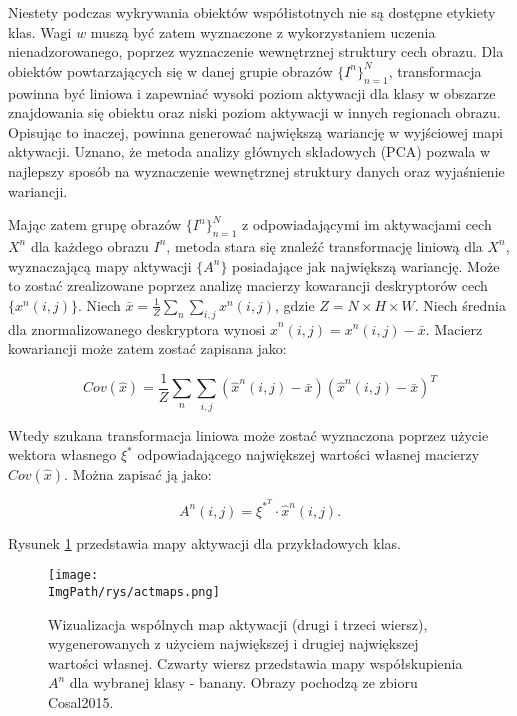 \documentclass[a4paper,12pt,twoside,openany]{report}
\newcommand{\ImgPath}{.}
\begin{document}
Niestety podczas wykrywania obiektów współistotnych nie są dostępne etykiety klas. Wagi $w$ muszą być zatem wyznaczone z wykorzystaniem uczenia nienadzorowanego, poprzez wyznaczenie wewnętrznej struktury cech obrazu. Dla obiektów powtarzających się w danej grupie obrazów $\{I^n\}^N_{n=1}$, transformacja powinna być liniowa i zapewniać wysoki poziom aktywacji dla klasy w obszarze znajdowania się obiektu oraz niski poziom aktywacji w innych regionach obrazu. Opisując to inaczej, powinna generować największą wariancję w wyjściowej mapi aktywacji. Uznano, że metoda analizy głównych składowych (PCA) pozwala w najlepszy sposób na wyznaczenie wewnętrznej struktury danych oraz wyjaśnienie wariancji.

Mając zatem grupę obrazów $\{I^n\}^N_{n=1}$ z odpowiadającymi im aktywacjami cech $X^n$ dla każdego obrazu $I^n$, metoda stara się znaleźć transformację liniową dla $X^n$, wyznaczającą mapy aktywacji $\{A^n\}$ posiadające jak największą wariancję. Może to zostać zrealizowane poprzez analizę macierzy kowarancji deskryptorów cech $\{x^n(i,j)\}$. Niech $\bar{x} = \frac{1}{Z}\sum_n\sum_{i,j}x^n(i,j)$, gdzie $Z=N\times H\times W$. Niech średnia dla znormalizowanego deskryptora wynosi $\hat{x}^n(i,j) = x^n(i,j) - \bar{x}$. Macierz kowariancji może zatem zostać zapisana jako:

\begin{equation}
Cov(\hat{x})=\frac{1}{Z}\sum_n\sum_{i,j}(\hat{x}^n(i,j) - \bar{x})(\hat{x}^n(i,j) - \bar{x})^T
\end{equation}


Wtedy szukana transformacja liniowa może zostać wyznaczona poprzez użycie wektora własnego $\xi^*$ odpowiadającego największej wartości własnej macierzy $Cov(\hat{x})$. Można zapisać ją jako:

\begin{equation}
A^n(i,j) = \xi^{*^T} \cdot \hat{x}^n(i,j).
\end{equation}


Rysunek \ref{actmaps} przedstawia mapy aktywacji dla przykładowych klas. 

\begin{figure}[h]
	\centering
	\texttt{[image: \\ImgPath/rys/actmaps.png]}
	\caption{Wizualizacja wspólnych map aktywacji (drugi i trzeci wiersz), wygenerowanych z użyciem największej i drugiej największej wartości własnej. Czwarty wiersz przedstawia mapy współskupienia $A^n$ dla wybranej klasy - banany. Obrazy pochodzą ze zbioru Cosal2015.}
	\label{actmaps}
\end{figure}
\end{document}
